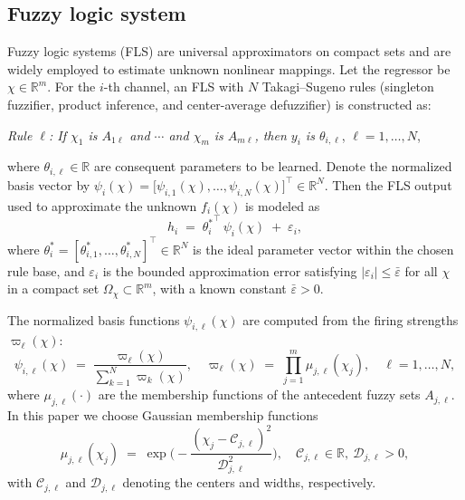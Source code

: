 \documentclass[pdflatex,sn-mathphys-num]{sn-jnl}%
\theoremstyle{thmstyleone}%
\newtheorem{assumption}{Assumption}
\theoremstyle{thmstyletwo}%
\theoremstyle{thmstylethree}%
\begin{document}


 


\subsection{Fuzzy logic system }
\par Fuzzy logic systems (FLS) are universal approximators on compact sets and are widely employed to estimate unknown nonlinear mappings. Let the regressor be $\chi\in\mathbb{R}^m$. For the $i$-th channel, an FLS with $N$ Takagi--Sugeno rules (singleton fuzzifier, product inference, and center-average defuzzifier) is constructed as:
\begin{center}
\emph{Rule $\ell$: If $\chi_1$ is $A_{1\ell}$ and $\cdots$ and $\chi_m$ is $A_{m\ell}$, then $y_i$ is $\theta_{i,\ell}$}, \quad $\ell=1,\dots,N$,
\end{center}
where $\theta_{i,\ell}\in\mathbb{R}$ are consequent parameters to be learned. Denote the normalized basis vector by
\(
\psi_i(\chi)=\big[\psi_{i,1}(\chi),\dots,\psi_{i,N}(\chi)\big]^\top\in\mathbb{R}^N.
\)
Then the FLS output used to approximate the unknown $f_i(\chi)$ is modeled as
\begin{equation}
    h_i \;=\; {\theta_i^*}^{\!\top}\,\psi_i(\chi)\;+\;\varepsilon_i,
    \label{eq:4}
\end{equation}
where $\theta_i^*=[\theta_{i,1}^*,\dots,\theta_{i,N}^*]^\top\in\mathbb{R}^N$ is the ideal parameter vector within the chosen rule base, and $\varepsilon_i$ is the bounded approximation error satisfying $|\varepsilon_i|\le\bar\varepsilon$ for all $\chi$ in a compact set $\Omega_\chi\subset\mathbb{R}^m$, with a known constant $\bar\varepsilon>0$.

\par The normalized basis functions $\psi_{i,\ell}(\chi)$ are computed from the firing strengths $\varpi_\ell(\chi)$:
\begin{equation}
    \psi_{i,\ell}(\chi)\;=\;\frac{\varpi_\ell(\chi)}{\sum_{k=1}^N \varpi_k(\chi)},
    \quad
    \varpi_\ell(\chi)\;=\;\prod_{j=1}^m \mu_{j,\ell}(\chi_j),
    \quad \ell=1,\dots,N,
    \label{eq:5}
\end{equation}
where $\mu_{j,\ell}(\cdot)$ are the membership functions of the antecedent fuzzy sets $A_{j,\ell}$. In this paper we choose Gaussian membership functions
\[
\mu_{j,\ell}(\chi_j)\;=\;\exp\!\Big(-\frac{(\chi_j-\mathcal{C}_{j,\ell})^2}{\mathcal{D}_{j,\ell}^2}\Big),\quad
\mathcal{C}_{j,\ell}\in\mathbb{R},\ \mathcal{D}_{j,\ell}>0,
\]
with $\mathcal{C}_{j,\ell}$ and $\mathcal{D}_{j,\ell}$ denoting the centers and widths, respectively.
\end{document}
